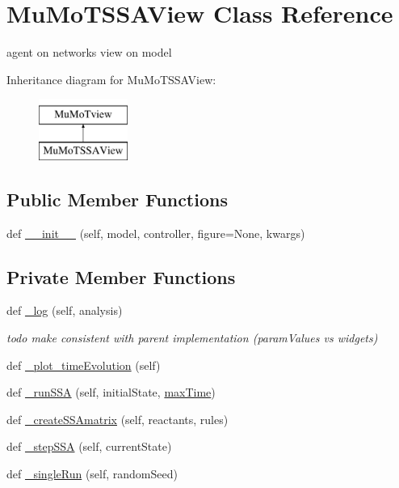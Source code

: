 \hypertarget{class_mu_mo_t_1_1_mu_mo_t_s_s_a_view}{}\section{Mu\+Mo\+T\+S\+S\+A\+View Class Reference}
\label{class_mu_mo_t_1_1_mu_mo_t_s_s_a_view}


agent on networks view on model  


Inheritance diagram for Mu\+Mo\+T\+S\+S\+A\+View\+:\begin{figure}[H]
\begin{center}
\leavevmode
\includegraphics[height=2.000000cm]{class_mu_mo_t_1_1_mu_mo_t_s_s_a_view}
\end{center}
\end{figure}
\subsection*{Public Member Functions}
\begin{DoxyCompactItemize}
\item 
def \hyperlink{class_mu_mo_t_1_1_mu_mo_t_s_s_a_view_a56403a3c4cf6f48d384a21f5ecb01918}{\+\_\+\+\_\+init\+\_\+\+\_\+} (self, model, controller, figure=None, kwargs)
\end{DoxyCompactItemize}
\subsection*{Private Member Functions}
\begin{DoxyCompactItemize}
\item 
def \hyperlink{class_mu_mo_t_1_1_mu_mo_t_s_s_a_view_a8b4ffd0e4999bd45c6ca33fe0f40d1e3}{\+\_\+log} (self, analysis)
\begin{DoxyCompactList}\small\item\em todo make consistent with parent implementation (param\+Values vs widgets) \end{DoxyCompactList}\item 
def \hyperlink{class_mu_mo_t_1_1_mu_mo_t_s_s_a_view_ace35072dcd3e51e67107f62b4de0d5fe}{\+\_\+plot\+\_\+time\+Evolution} (self)
\item 
def \hyperlink{class_mu_mo_t_1_1_mu_mo_t_s_s_a_view_a7a47a6ae331f68fc6248f06c946c62a3}{\+\_\+run\+S\+SA} (self, initial\+State, \hyperlink{class_mu_mo_t_1_1_mu_mo_tview_aa820f7e11b025b06f4eeb0ad7581ad34}{max\+Time})
\item 
def \hyperlink{class_mu_mo_t_1_1_mu_mo_t_s_s_a_view_aa6a98f2dd615dd77ffd3f6758b471df9}{\+\_\+create\+S\+S\+Amatrix} (self, reactants, rules)
\item 
def \hyperlink{class_mu_mo_t_1_1_mu_mo_t_s_s_a_view_a1d2f8bb3e67d82bd01a95d58220d099b}{\+\_\+step\+S\+SA} (self, current\+State)
\item 
def \hyperlink{class_mu_mo_t_1_1_mu_mo_t_s_s_a_view_a51d421aacb4cd83af5f1c2e60c3dff9c}{\+\_\+single\+Run} (self, random\+Seed)
\end{DoxyCompactItemize}
